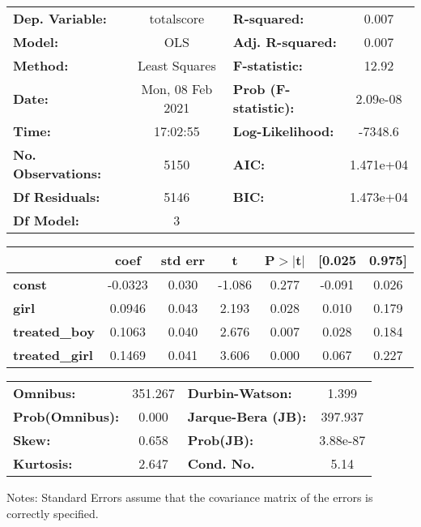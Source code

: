 \begin{center}
\begin{tabular}{lclc}
\toprule
\textbf{Dep. Variable:}    &    totalscore    & \textbf{  R-squared:         } &     0.007   \\
\textbf{Model:}            &       OLS        & \textbf{  Adj. R-squared:    } &     0.007   \\
\textbf{Method:}           &  Least Squares   & \textbf{  F-statistic:       } &     12.92   \\
\textbf{Date:}             & Mon, 08 Feb 2021 & \textbf{  Prob (F-statistic):} &  2.09e-08   \\
\textbf{Time:}             &     17:02:55     & \textbf{  Log-Likelihood:    } &   -7348.6   \\
\textbf{No. Observations:} &        5150      & \textbf{  AIC:               } & 1.471e+04   \\
\textbf{Df Residuals:}     &        5146      & \textbf{  BIC:               } & 1.473e+04   \\
\textbf{Df Model:}         &           3      & \textbf{                     } &             \\
\bottomrule
\end{tabular}
\begin{tabular}{lcccccc}
                       & \textbf{coef} & \textbf{std err} & \textbf{t} & \textbf{P$> |$t$|$} & \textbf{[0.025} & \textbf{0.975]}  \\
\midrule
\textbf{const}         &      -0.0323  &        0.030     &    -1.086  &         0.277        &       -0.091    &        0.026     \\
\textbf{girl}          &       0.0946  &        0.043     &     2.193  &         0.028        &        0.010    &        0.179     \\
\textbf{treated\_boy}  &       0.1063  &        0.040     &     2.676  &         0.007        &        0.028    &        0.184     \\
\textbf{treated\_girl} &       0.1469  &        0.041     &     3.606  &         0.000        &        0.067    &        0.227     \\
\bottomrule
\end{tabular}
\begin{tabular}{lclc}
\textbf{Omnibus:}       & 351.267 & \textbf{  Durbin-Watson:     } &    1.399  \\
\textbf{Prob(Omnibus):} &   0.000 & \textbf{  Jarque-Bera (JB):  } &  397.937  \\
\textbf{Skew:}          &   0.658 & \textbf{  Prob(JB):          } & 3.88e-87  \\
\textbf{Kurtosis:}      &   2.647 & \textbf{  Cond. No.          } &     5.14  \\
\bottomrule
\end{tabular}
\end{center}

Notes: \newline
 [1] Standard Errors assume that the covariance matrix of the errors is correctly specified.
